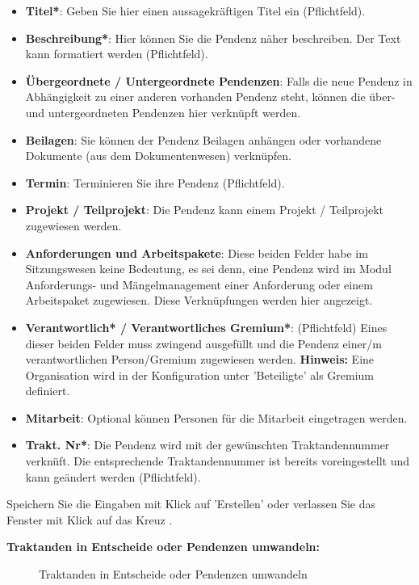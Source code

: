 \begin{itemize}
\item \textbf{Titel*}: Geben Sie hier einen aussagekräftigen Titel ein (Pflichtfeld).
\item \textbf{Beschreibung*}: Hier können Sie die Pendenz näher beschreiben. Der Text kann formatiert werden (Pflichtfeld).
\item \textbf{Übergeordnete / Untergeordnete Pendenzen}: Falls die neue Pendenz in Abhängigkeit zu einer anderen vorhanden Pendenz steht, können die über- und untergeordneten Pendenzen hier verknüpft werden.
\item \textbf{Beilagen}: Sie können der Pendenz Beilagen anhängen oder vorhandene Dokumente (aus dem Dokumentenwesen) verknüpfen. 
\item \textbf{Termin}: Terminieren Sie ihre Pendenz (Pflichtfeld).
\item \textbf{Projekt / Teilprojekt}: Die Pendenz kann einem Projekt / Teilprojekt zugewiesen werden.
\item \textbf{Anforderungen und Arbeitspakete}: Diese beiden Felder habe im Sitzungswesen keine Bedeutung, es sei denn, eine Pendenz wird im Modul Anforderungs- und Mängelmanagement einer Anforderung oder einem Arbeitspaket zugewiesen. Diese Verknüpfungen werden hier angezeigt.
\item \textbf{Verantwortlich* / Verantwortliches Gremium*}: (Pflichtfeld) Eines dieser beiden Felder muss zwingend ausgefüllt und die Pendenz einer/m verantwortlichen Person/Gremium zugewiesen werden. \textbf{Hinweis:} Eine Organisation wird in der Konfiguration unter 'Beteiligte' als Gremium definiert.
\item \textbf{Mitarbeit}: Optional können Personen für die Mitarbeit eingetragen werden.
\item \textbf{Trakt. Nr*}: Die Pendenz wird mit der gewünschten Traktandennummer verknüft. Die entsprechende Traktandennummer ist bereits voreingestellt und kann geändert werden (Pflichtfeld).
\end{itemize}

Speichern Sie die Eingaben mit Klick auf 'Erstellen'  oder verlassen Sie das Fenster mit Klick auf das Kreuz .

\vspace{\baselineskip}

\textbf{Traktanden in Entscheide oder Pendenzen umwandeln:}

\begin{figure}[H]
\caption{Traktanden in Entscheide oder Pendenzen umwandeln}
\end{figure}

